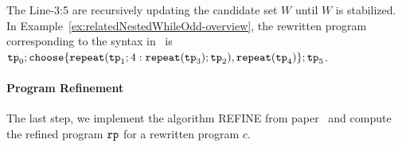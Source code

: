 The Line-3:5 are recursively updating the candidate set $W$ until $W$ is stabilized.
In Example~\ref{ex:relatedNestedWhileOdd-overview}, the rewritten program corresponding to the syntax in~\cite{GulwaniJK09} is
$ 
\tpath_0 ; \rpchoose{ \rprepeat(\tpath_1; 4:\rprepeat(\tpath_3); \tpath_2), 
\rprepeat(\tpath_4) }; \tpath_5
$.

\paragraph{Program Refinement}
The last step, we implement the algorithm REFINE from paper~\cite{GulwaniJK09} and compute the 
refined program $\mathtt{rp}$ for a rewritten program $c$.



